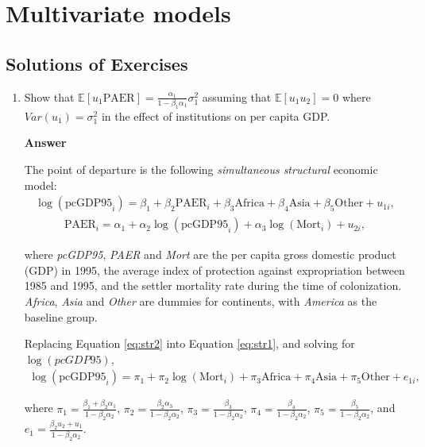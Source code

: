 \chapter{Multivariate models}\label{chap7}

\section{Solutions of Exercises}\label{sec71}
\begin{enumerate}[leftmargin=*]

	\item Show that $\mathbb{E}[u_1\text{PAER}]=\frac{\alpha_1}{1-\beta_1\alpha_1}\sigma^2_1$ assuming that $\mathbb{E}[u_1u_2]=0$ where $Var(u_1)=\sigma^2_1$ in the effect of institutions on per capita GDP.
	
	\textbf{Answer}
	
	The point of departure is the following \textit{simultaneous structural} economic model:
	\begin{align}\label{eq:str1}
		\log(\text{pcGDP95}_i)=\beta_1+\beta_2\text{PAER}_i+\beta_3 \text{Africa}+\beta_4 \text{Asia}+\beta_5 \text{Other}+u_{1i},
	\end{align}
	\begin{align}\label{eq:str2}
		\text{PAER}_i=\alpha_1+\alpha_2\log(\text{pcGDP95}_i)+\alpha_3\log(\text{Mort}_i)+u_{2i},
	\end{align}

where \textit{pcGDP95}, \textit{PAER} and \textit{Mort} are the per capita gross domestic product (GDP) in 1995, the average index of protection against expropriation between 1985 and 1995, and the settler mortality rate during the time of colonization. \textit{Africa}, \textit{Asia} and \textit{Other} are dummies for continents, with \textit{America} as the baseline group.

Replacing Equation \ref{eq:str2} into Equation \ref{eq:str1}, and solving for $\log(\textit{pcGDP95})$,
\begin{align}\label{eq:red1}
	\log(\text{pcGDP95}_i)=\pi_1+\pi_2\log(\text{Mort}_i)+\pi_3 \text{Africa}+\pi_4 \text{Asia}+\pi_5 \text{Other}+e_{1i},   
\end{align}

where $\pi_1=\frac{\beta_1+\beta_2\alpha_1}{1-\beta_2\alpha_2}$, $\pi_2=\frac{\beta_2\alpha_3}{1-\beta_2\alpha_2}$, $\pi_3=\frac{\beta_3}{1-\beta_2\alpha_2}$, $\pi_4=\frac{\beta_4}{1-\beta_2\alpha_2}$, 
$\pi_5=\frac{\beta_5}{1-\beta_2\alpha_2}$, and $e_1=\frac{\beta_2u_2+u_1}{1-\beta_2\alpha_2}$.


\end{enumerate}
